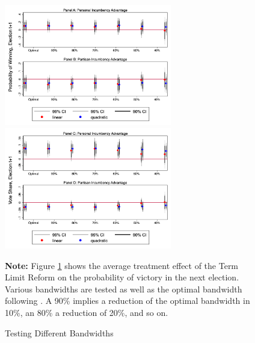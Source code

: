  \begin{figure}[h]   
\centering
 \caption{Testing Different Bandwidths}
 \label{fig:bandwidths}
\includegraphics[width=0.65\textwidth]{Chapter2/Figures_incumbency/probability_bandwidths.png}
       \captionsetup{justification=centering}
 \includegraphics[width=0.65\textwidth]{Chapter2/Figures_incumbency/margin_bandwidths.png}

 \textbf{Note:} Figure \ref{fig:bandwidths} shows the average treatment effect of the Term Limit Reform on the probability of victory in the next election. Various bandwidths are tested as well as the optimal bandwidth following \citet{calonicoetal_2014}. A 90\% implies a reduction of the optimal bandwidth in 10\%, an 80\% a reduction of 20\%, and so on.
   
\end{figure} 
  